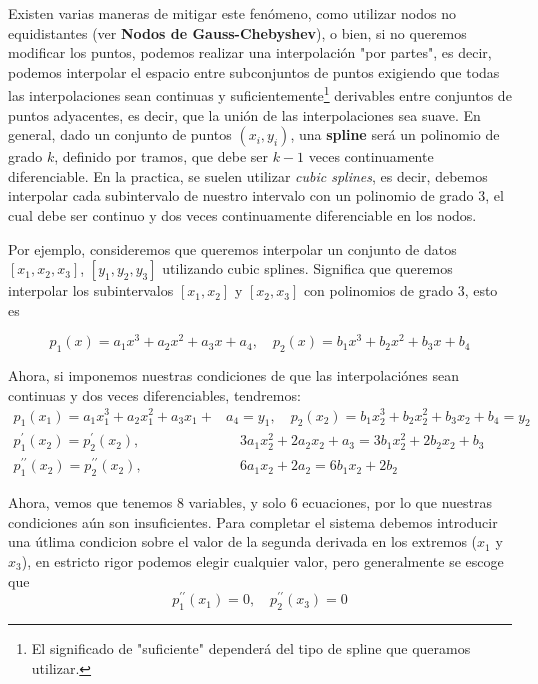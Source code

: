 
Existen varias maneras de mitigar este fenómeno, como utilizar nodos no equidistantes (ver \textbf{Nodos de Gauss-Chebyshev}), o bien, si no queremos modificar los puntos, podemos realizar una interpolación "por partes", es decir, podemos interpolar el espacio entre subconjuntos de puntos exigiendo que todas las interpolaciones sean continuas y suficientemente\footnote{El significado de "suficiente" dependerá del tipo de spline que queramos utilizar.} derivables entre conjuntos de puntos adyacentes, es decir, que la unión de las interpolaciones sea suave. En general, dado un conjunto de puntos $(x_{i}, y_{i})$, una \textbf{spline} será un polinomio de grado $k$, definido por tramos, que debe ser $k-1$ veces continuamente diferenciable. En la practica, se suelen utilizar \textit{cubic splines}, es decir, debemos interpolar cada subintervalo de nuestro intervalo con un polinomio de grado 3, el cual debe ser continuo y dos veces continuamente diferenciable en los nodos.

Por ejemplo, consideremos que queremos interpolar un conjunto de datos $[x_{1}, x_{2}, x_{3}]$, $[y_{1}, y_{2}, y_{3}]$ utilizando cubic splines. Significa que queremos interpolar los subintervalos $[x_{1}, x_{2}]$ y $[x_{2}, x_{3}]$ con polinomios de grado 3, esto es

\begin{equation}
  p_{1}(x) = a_{1}x^{3} + a_{2}x^{2} + a_{3}x + a_{4}, \quad 
  p_{2}(x) = b_{1}x^{3} + b_{2}x^{2} + b_{3}x + b_{4}
 \end{equation}

Ahora, si imponemos nuestras condiciones de que las interpolaciónes sean continuas y dos veces diferenciables, tendremos:
\begin{align}
  p_{1}(x_{1}) = a_{1}x^{3}_{1} + a_{2}x^{2}_{1} + a_{3}x_{1} + &a_{4} = y_{1}, \quad 
  p_{2}(x_{2}) = b_{1}x^{3}_{2} + b_{2}x^{2}_{2} + b_{3}x_{2} + b_{4} = y_{2} \\
  p^{\prime}_{1}(x_{2}) = p^{\prime}_{2}(x_{2}), &\quad 3a_{1}x^{2}_{2} + 2a_{2}x_{2} + a_{3} = 3b_{1}x^{2}_{2} + 2b_{2}x_{2} + b_{3} \\
  p^{\prime \prime}_{1}(x_{2}) = p^{\prime \prime}_{2}(x_{2}), &\quad 6a_{1}x_{2} + 2a_{2} = 6b_{1}x_{2} + 2b_{2}
 \end{align}

Ahora, vemos que tenemos 8 variables, y solo 6 ecuaciones, por lo que nuestras condiciones aún son insuficientes. Para completar el sistema debemos introducir una útlima condicion sobre el valor de la segunda derivada en los extremos ($x_{1}$ y $x_{3}$), en estricto rigor podemos elegir cualquier valor, pero generalmente se escoge que
\begin{equation} \label{eq:natcond}
  p_{1}^{\prime \prime}(x_{1})=0, \quad p_{2}^{\prime \prime}(x_{3}) = 0
 \end{equation}

